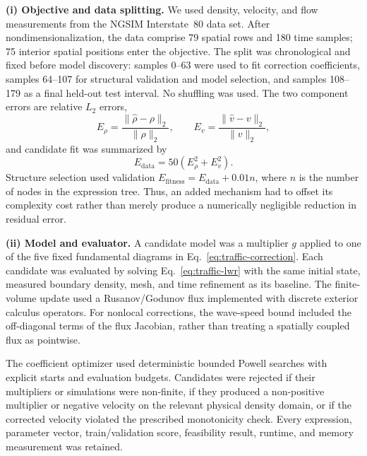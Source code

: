 \noindent\textbf{(i) Objective and data splitting.}
We used density, velocity, and flow measurements from the NGSIM Interstate~80
data set. After nondimensionalization, the data comprise 79 spatial rows and
180 time samples; 75 interior spatial positions enter the objective. The split
was chronological and fixed before model discovery: samples 0--63 were used to
fit correction coefficients, samples 64--107 for structural validation and
model selection, and samples 108--179 as a final held-out test interval. No
shuffling was used. The two component errors are relative $L_2$ errors,
\begin{equation}
    E_\rho = \frac{\lVert\widehat{\rho}-\rho\rVert_2}
                        {\lVert\rho\rVert_2},
    \qquad
    E_v = \frac{\lVert\widehat{v}-v\rVert_2}
                    {\lVert v\rVert_2},
\end{equation}
and candidate fit was summarized by
\begin{equation}
    E_{\mathrm{data}} = 50\left(E_\rho^2+E_v^2\right).
    \label{eq:traffic-data-error}
\end{equation}
Structure selection used validation
$E_{\mathrm{fitness}}=E_{\mathrm{data}}+0.01n$, where $n$ is the number of
nodes in the expression tree. Thus, an added mechanism had to offset its
complexity cost rather than merely produce a numerically negligible reduction
in residual error.

\noindent\textbf{(ii) Model and evaluator.}
A candidate model was a multiplier $g$ applied to one of the five fixed
fundamental diagrams in Eq.~\eqref{eq:traffic-correction}. Each candidate was
evaluated by solving Eq.~\eqref{eq:traffic-lwr} with the same initial state,
measured boundary density, mesh, and time refinement as its baseline. The
finite-volume update used a Rusanov/Godunov flux implemented with discrete
exterior calculus operators. For nonlocal corrections, the wave-speed bound
included the off-diagonal terms of the flux Jacobian, rather than treating a
spatially coupled flux as pointwise.

The coefficient optimizer used deterministic bounded Powell searches with
explicit starts and evaluation budgets. Candidates were rejected if their
multipliers or simulations were non-finite, if they produced a non-positive
multiplier or negative velocity on the relevant physical density domain, or if
the corrected velocity violated the prescribed monotonicity check. Every
expression, parameter vector, train/validation score, feasibility result,
runtime, and memory measurement was retained.

